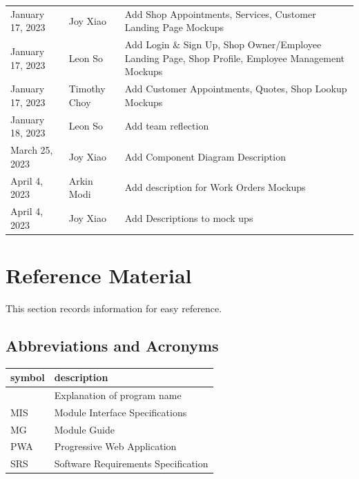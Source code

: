 \documentclass[12pt, titlepage]{article}
\begin{document}
\begin{table}[hp]
\begin{tabularx}{\textwidth}{llX}
		January 17, 2023  & Joy Xiao              & Add Shop Appointments, Services, Customer Landing Page Mockups                                    \\
		January 17, 2023  & Leon So               & Add Login \& Sign Up, Shop Owner/Employee Landing Page, Shop Profile, Employee Management Mockups \\
		January 17, 2023  & Timothy Choy          & Add Customer Appointments, Quotes, Shop Lookup Mockups                                            \\
		January 18, 2023  & Leon So               & Add team reflection                                                                               \\
		March 25, 2023    & Joy Xiao              & Add Component Diagram Description                                                                 \\
		April 4, 2023     & Arkin Modi            & Add description for Work Orders Mockups                                                           \\
		April 4, 2023     & Joy Xiao              & Add Descriptions to mock ups                                                                      \\
		\bottomrule
	\end{tabularx}
\end{table}

\newpage

\section{Reference Material}

This section records information for easy reference.

\subsection{Abbreviations and Acronyms}

\begin{tabular}{l l}
	\toprule
	\textbf{symbol} & \textbf{description}                \\
	\midrule
	\progname       & Explanation of program name         \\
	MIS             & Module Interface Specifications     \\
	MG              & Module Guide                        \\
	PWA             & Progressive Web Application         \\
	SRS             & Software Requirements Specification \\
	\bottomrule
\end{tabular}
\end{document}
